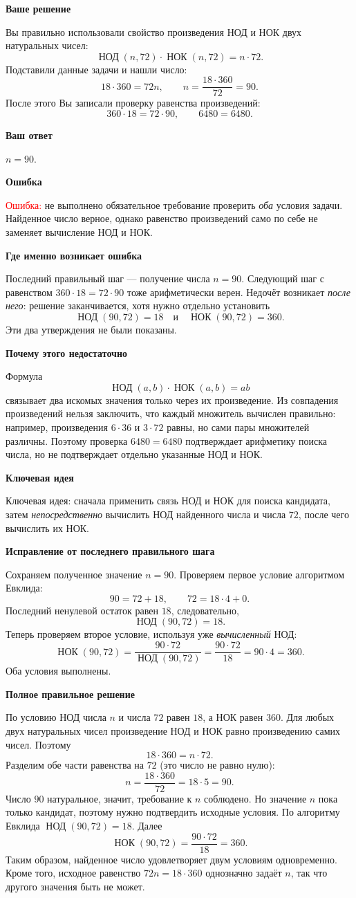 \documentclass[12pt,a4paper]{article}
\newcommand{\gcdru}{\mathop{\text{НОД}}\nolimits}
\newcommand{\lcmru}{\mathop{\text{НОК}}\nolimits}
\newcommand{\subheading}[1]{\par\smallskip\textbf{#1}\par}
\begin{document}
\subheading{Ваше решение}
Вы правильно использовали свойство произведения НОД и НОК двух натуральных чисел:
\[
\gcdru(n,72)\cdot\lcmru(n,72)=n\cdot72.
\]
Подставили данные задачи и нашли число:
\[
18\cdot360=72n,\qquad
n=\frac{18\cdot360}{72}=90.
\]
После этого Вы записали проверку равенства произведений:
\[
360\cdot18=72\cdot90,\qquad 6480=6480.
\]

\subheading{Ваш ответ}
$n=90$.

\subheading{Ошибка}
\textcolor{red}{Ошибка:} не выполнено обязательное требование проверить \emph{оба} условия задачи. Найденное число верное, однако равенство произведений само по себе не заменяет вычисление НОД и НОК.

\subheading{Где именно возникает ошибка}
Последний правильный шаг --- получение числа $n=90$. Следующий шаг с равенством $360\cdot18=72\cdot90$ тоже арифметически верен. Недочёт возникает \emph{после него}: решение заканчивается, хотя нужно отдельно установить
\[
\gcdru(90,72)=18\quad\text{и}\quad\lcmru(90,72)=360.
\]
Эти два утверждения не были показаны.

\subheading{Почему этого недостаточно}
Формула
\[
\gcdru(a,b)\cdot\lcmru(a,b)=ab
\]
связывает два искомых значения только через их произведение. Из совпадения произведений нельзя заключить, что каждый множитель вычислен правильно: например, произведения $6\cdot36$ и $3\cdot72$ равны, но сами пары множителей различны. Поэтому проверка $6480=6480$ подтверждает арифметику поиска числа, но не подтверждает отдельно указанные НОД и НОК.

\subheading{Ключевая идея}
\textcolor{blue!60!black}{Ключевая идея:} сначала применить связь НОД и НОК для поиска кандидата, затем \emph{непосредственно} вычислить НОД найденного числа и числа $72$, после чего вычислить их НОК.

\subheading{Исправление от последнего правильного шага}
Сохраняем полученное значение $n=90$. Проверяем первое условие алгоритмом Евклида:
\[
90=72+18,\qquad 72=18\cdot4+0.
\]
Последний ненулевой остаток равен $18$, следовательно,
\[
\gcdru(90,72)=18.
\]
Теперь проверяем второе условие, используя уже \emph{вычисленный} НОД:
\[
\lcmru(90,72)=\frac{90\cdot72}{\gcdru(90,72)}
=\frac{90\cdot72}{18}=90\cdot4=360.
\]
Оба условия выполнены.

\subheading{Полное правильное решение}
По условию НОД числа $n$ и числа $72$ равен $18$, а НОК равен $360$. Для любых двух натуральных чисел произведение НОД и НОК равно произведению самих чисел. Поэтому
\[
18\cdot360=n\cdot72.
\]
Разделим обе части равенства на $72$ (это число не равно нулю):
\[
n=\frac{18\cdot360}{72}
=18\cdot5=90.
\]
Число $90$ натуральное, значит, требование к $n$ соблюдено. Но значение $n$ пока только кандидат, поэтому нужно подтвердить исходные условия. По алгоритму Евклида $\gcdru(90,72)=18$. Далее
\[
\lcmru(90,72)=\frac{90\cdot72}{18}=360.
\]
Таким образом, найденное число удовлетворяет двум условиям одновременно. Кроме того, исходное равенство $72n=18\cdot360$ однозначно задаёт $n$, так что другого значения быть не может.
\end{document}
